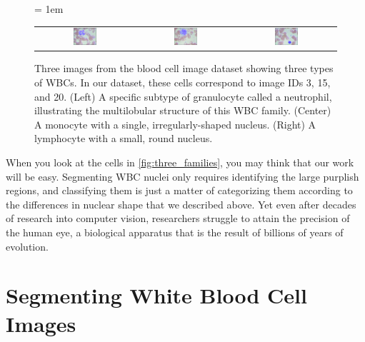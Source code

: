 \begin{figure}[h]
\centering
\tabcolsep = 1em
\mySfFamily
\begin{tabular}{c c c}
\includegraphics[width = 0.25\textwidth]{../images_CMYK/neutrophil} & \includegraphics[width = 0.25\textwidth]{../images_CMYK/monocyte} & \includegraphics[width = 0.25\textwidth]{../images_CMYK/lymphocyte}
\end{tabular}
\caption{Three images from the blood cell image dataset showing three types of WBCs. In our dataset, these cells correspond to image IDs 3, 15, and 20. (Left) A specific subtype of granulocyte called a neutrophil, illustrating the multilobular structure of this WBC family. (Center) A monocyte with a single, irregularly-shaped nucleus. (Right) A lymphocyte with a small, round nucleus.}
\label{fig:three_families}
\end{figure}

When you look at the cells in \autoref{fig:three_families}, you may think that our work will be easy. Segmenting WBC nuclei only requires identifying the large purplish regions, and classifying them is just a matter of categorizing them according to the differences in nuclear shape that we described above. Yet even after decades of research into computer vision, researchers struggle to attain the precision of the human eye, a biological apparatus that is the result of billions of years of evolution.\\

\FloatBarrier
{}

\section{Segmenting White Blood Cell Images}
\label{sec:segmenting_white_blood_cell_images}
